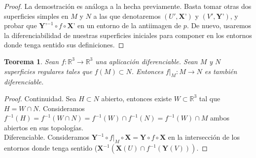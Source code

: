 \documentclass[a4paper,10pt]{book}
\newtheorem{thm}{Teorema}[chapter]
\newcommand{\RR}{\mathbb R}
\newcommand{\RRR}{\RR^3}
\begin{document}
\begin{proof}
La demostración es análoga a la hecha previamente. Basta tomar otras dos superficies simples en $M$ y $N$ a las que denotaremos $(U',\textbf{X'})$ y $(V',\textbf{Y'})$, y probar que $\textbf{Y'}^{-1}\circ f\circ \textbf{X'}$ en un entorno de la antiimagen de $p$. De nuevo, usaremos la diferenciabilidad de nuestras superficies iniciales para componer en los entornos donde tenga sentido sus definiciones.
\end{proof}

\begin{thm}
Sean $f:\RRR\longrightarrow \RRR$ una aplicación diferenciable. Sean $M$ y $N$ superficies regulares tales que $f(M)\subset N$. Entonces $f|_M:M\longrightarrow N$ es también diferenciable.
\end{thm}

\begin{proof}
Continuidad. Sea $H\subset N$ abierto, entonces existe $W\subset \RRR$ tal que $H=W\cap N$. Consideramos $f^{-1}(H)=f^{-1}(W\cap N)=f^{-1}(W)\cap f^{-1}(N)=f^{-1}(W)\cap M$ ambos abiertos en sus topologías.\\
Diferenciable. Consideramos $\textbf{Y}^{-1}\circ f|_M \circ \textbf{X}=\textbf{Y}\circ f \circ \textbf{X}$ en la intersección de los entornos donde tenga sentido ($\textbf{X}^{-1}(\textbf{X}(U)\cap f^{-1}(\textbf{Y}(V)))$. 
\end{proof}
\end{document}
